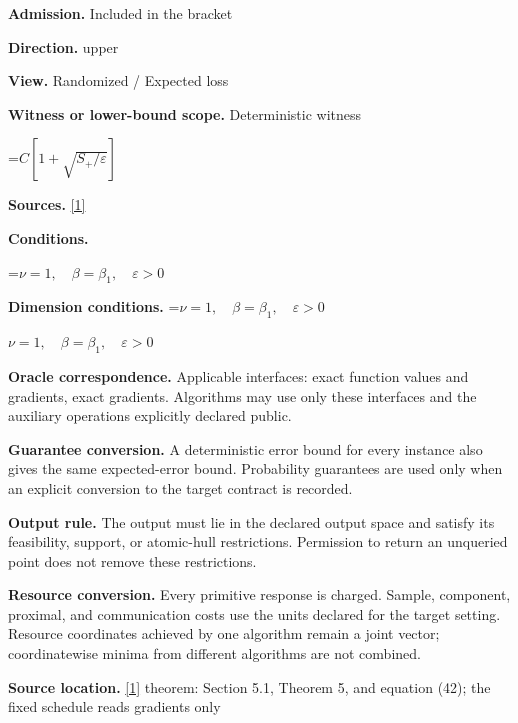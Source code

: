 \documentclass[10pt,a4paper]{article}
\newcommand{\AtlasMath}[1]{\par\begingroup\centering\setbox0=\hbox{$\displaystyle #1$}\ifdim\wd0>1.4\linewidth\typeout{ATLAS WIDE FORMULA: \the\wd0}\fi\ifdim\wd0>\linewidth\resizebox{\linewidth}{!}{\box0}\else\box0\fi\par\endgroup}
\newcommand{\AtlasInlineMath}[1]{\begingroup\setbox0=\hbox{$#1$}\ifdim\wd0>.4\linewidth\endgroup\AtlasMath{#1}\else\endgroup$#1$\fi}
\begin{document}
\textbf{Admission.} Included in the bracket



\textbf{Direction.} upper



\textbf{View.} Randomized / Expected loss



\textbf{Witness or lower-bound scope.} Deterministic witness



\AtlasMath{C[1+\sqrt{S_+/\varepsilon}]}


\textbf{Sources.} \href{https://optimization-online.org/wp-content/uploads/2010/12/2865.pdf}{[1]}



\textbf{Conditions.}
\AtlasMath{\nu=1,\quad\beta=\beta_1,\quad\varepsilon>0}




\textbf{Dimension conditions.} \AtlasInlineMath{\nu=1,\quad\beta=\beta_1,\quad\varepsilon>0}



\textbf{Oracle correspondence.} Applicable interfaces: exact function values and gradients, exact gradients. Algorithms may use only these interfaces and the auxiliary operations explicitly declared public.



\textbf{Guarantee conversion.} A deterministic error bound for every instance also gives the same expected-error bound. Probability guarantees are used only when an explicit conversion to the target contract is recorded.



\textbf{Output rule.} The output must lie in the declared output space and satisfy its feasibility, support, or atomic-hull restrictions. Permission to return an unqueried point does not remove these restrictions.



\textbf{Resource conversion.} Every primitive response is charged. Sample, component, proximal, and communication costs use the units declared for the target setting. Resource coordinates achieved by one algorithm remain a joint vector; coordinatewise minima from different algorithms are not combined.



\textbf{Source location.} \href{https://optimization-online.org/wp-content/uploads/2010/12/2865.pdf}{[1]} theorem: Section 5.1, Theorem 5, and equation (42); the fixed schedule reads gradients only
\end{document}
